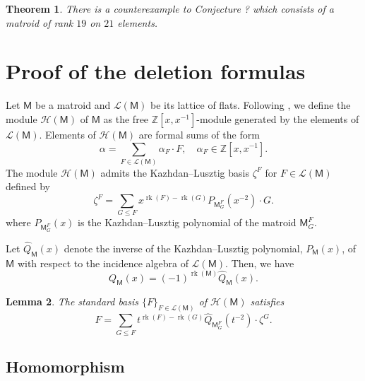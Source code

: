 \documentclass[11pt, a4paper, english]{amsart}
\theoremstyle{teoremas}
\newtheorem{theorem}{Theorem}[section]
\newtheorem{lemma}[theorem]{Lemma}
\theoremstyle{definition}
\DeclareMathOperator{\rk}{rk}
\newcommand{\M}{\mathsf{M}}
\newcommand{\cL}{\mathcal{L}}
\newcommand{\cH}{\mathcal{H}}
\begin{document}
\begin{theorem}
    There is a counterexample to Conjecture ? which consists of a matroid of rank $19$ on $21$ elements.
\end{theorem}


\section{Proof of the deletion formulas}

Let $\M$ be a matroid and $\cL(\M)$ be its lattice of flats. Following \cite{braden-vysogorets}, we define the module $\cH(\M)$ of $\M$ as the free $\mathbb{Z}[x, x^{-1}]$-module generated by the elements of $\cL(\M)$.
Elements of $\cH(\M)$ are formal sums of the form
\[
    \alpha = \sum_{F \in \cL(\M)} \alpha_F \cdot F, \quad \alpha_F \in \mathbb{Z}
    [x, x^{-1}].
\]
The module $\cH(\M)$ admits the Kazhdan--Lusztig basis $\zeta^F$ for $F \in \cL(\M)$ defined by
\[
    \zeta^F = \sum_{G \leq F} x^{\rk(F) - \rk(G)} P_{\M_G^F}(x^{-2}) \cdot G.
\]
where $P_{\M_G^F}(x)$ is the Kazhdan--Lusztig polynomial of the matroid $\M_G^F$.

Let $\hat{Q}_\M(x)$ denote the inverse of the Kazhdan--Lusztig polynomial, $P_\M(x)$, of $\M$ with respect to the incidence algebra of $\cL(\M)$. Then, we have
\begin{equation}
    Q_\M(x) = (-1)^{\rk(\M)} \hat{Q}_\M(x).
\end{equation}

\begin{lemma}\label{lem:standard_basis_in_zeta}
    The standard basis $\{F\}_{F \in \cL(\M)}$ of $\cH(\M)$ satisfies
    \begin{equation}
        \label{cob-lemma}
        F = \sum_{G \leq F} t^{\rk(F) - \rk(G)} \hat{Q}_{\M_G^F}(t^{-2}) \cdot \zeta^G.
    \end{equation}
\end{lemma}

\subsection{Homomorphism \text{$\Delta: \cH(\M) \to \cH(\M\setminus i)$}}\label{sec:delta}
\end{document}
